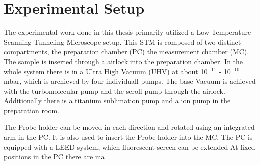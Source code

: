 \section{Experimental Setup}
\label{sec:versuchsandordnung}
The experimental work done in this thesis primarily utilized a Low-Temperature Scanning Tunneling Microscope setup.
This STM is composed of two distinct compartments, the preparation chamber (PC) the measurement chamber (MC).
The sample is inserted through a airlock into the preparation chamber.
In the whole system there is in a Ultra High Vacuum (UHV) at about 10$^{-11}$ - 10$^{-10}$ mbar, which is archieved by four individuall pumps.
The base Vacuum is achieved with the turbomolecular pump and the scroll pump through the airlock.
Additionally there is a titanium sublimation pump and a ion pump in the preparation room.


The Probe-holder can be moved in each direction and rotated using an integrated arm in the PC.
It is also used to insert the Probe-holder into the MC.
The PC is equipped with a LEED system, which fluorescent screen can be extended 
At fixed positions in the PC there are ma